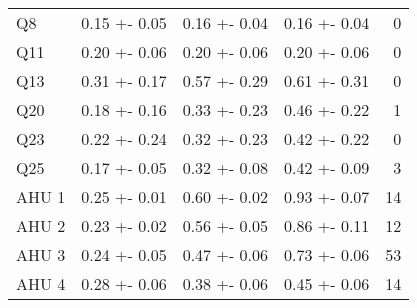 \begin{longtable}{llllr}
                Q8 &       0.15 +- 0.05 &       0.16 +- 0.04 &       0.16 +- 0.04 &                   0 \\
               Q11 &       0.20 +- 0.06 &       0.20 +- 0.06 &       0.20 +- 0.06 &                   0 \\
               Q13 &       0.31 +- 0.17 &       0.57 +- 0.29 &       0.61 +- 0.31 &                   0 \\
               Q20 &       0.18 +- 0.16 &       0.33 +- 0.23 &       0.46 +- 0.22 &                   1 \\
               Q23 &       0.22 +- 0.24 &       0.32 +- 0.23 &       0.42 +- 0.22 &                   0 \\
               Q25 &       0.17 +- 0.05 &       0.32 +- 0.08 &       0.42 +- 0.09 &                   3 \\
             AHU 1 &       0.25 +- 0.01 &       0.60 +- 0.02 &       0.93 +- 0.07 &                  14 \\
             AHU 2 &       0.23 +- 0.02 &       0.56 +- 0.05 &       0.86 +- 0.11 &                  12 \\
             AHU 3 &       0.24 +- 0.05 &       0.47 +- 0.06 &       0.73 +- 0.06 &                  53 \\
             AHU 4 &       0.28 +- 0.06 &       0.38 +- 0.06 &       0.45 +- 0.06 &                  14 \\
\end{longtable}
